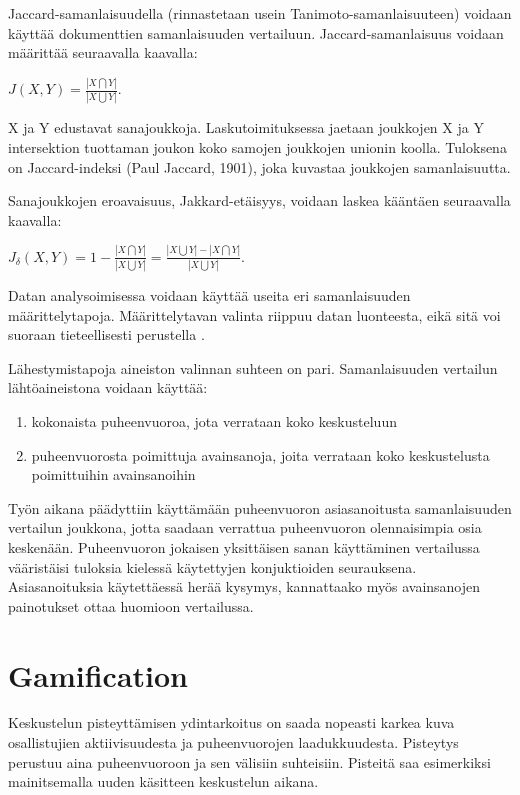 \documentclass[11pt,a4paper,oneside]{memoir}
\begin{document}
Jaccard-samanlaisuudella (rinnastetaan usein Tanimoto-samanlaisuuteen) voidaan käyttää dokumenttien samanlaisuuden vertailuun. Jaccard-samanlaisuus voidaan määrittää seuraavalla kaavalla:

\begin{math}
J(X, Y) = \frac{| X \bigcap Y |}{| X \bigcup Y |}.
\end{math}

X ja Y edustavat sanajoukkoja. Laskutoimituksessa jaetaan joukkojen X ja Y intersektion tuottaman joukon koko samojen joukkojen unionin koolla. Tuloksena on Jaccard-indeksi (Paul Jaccard, 1901), joka kuvastaa joukkojen samanlaisuutta.

Sanajoukkojen eroavaisuus, Jakkard-etäisyys, voidaan laskea kääntäen seuraavalla kaavalla:

\begin{math}
J_\delta(X, Y) = 1 - \frac{| X \bigcap Y |}{| X \bigcup Y |} = \frac{| X \bigcup Y | - | X \bigcap Y |}{| X \bigcup Y |}.
\end{math}

Datan analysoimisessa voidaan käyttää useita eri samanlaisuuden määrittelytapoja. Määrittelytavan valinta riippuu datan luonteesta, eikä sitä voi suoraan tieteellisesti perustella \cite[s. 298]{encyclopedia-of-distances}.

Lähestymistapoja aineiston valinnan suhteen on pari. Samanlaisuuden vertailun lähtöaineistona voidaan käyttää:

\begin{enumerate}
\item kokonaista puheenvuoroa, jota verrataan koko keskusteluun
\item puheenvuorosta poimittuja avainsanoja, joita verrataan koko keskustelusta poimittuihin avainsanoihin
\end{enumerate}

Työn aikana päädyttiin käyttämään puheenvuoron asiasanoitusta samanlaisuuden vertailun joukkona, jotta saadaan verrattua puheenvuoron olennaisimpia osia keskenään. Puheenvuoron jokaisen yksittäisen sanan käyttäminen vertailussa vääristäisi tuloksia kielessä käytettyjen konjuktioiden seurauksena. Asiasanoituksia käytettäessä herää kysymys, kannattaako myös avainsanojen painotukset ottaa huomioon vertailussa.

\section{Gamification}
Keskustelun pisteyttämisen ydintarkoitus on saada nopeasti karkea kuva osallistujien aktiivisuudesta ja puheenvuorojen laadukkuudesta. Pisteytys perustuu aina puheenvuoroon ja sen välisiin suhteisiin. Pisteitä saa esimerkiksi mainitsemalla uuden käsitteen keskustelun aikana.
\end{document}
